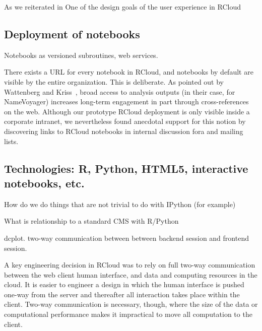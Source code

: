 As we reiterated in 
One of the design goals of the user experience in RCloud 


\subsection{Deployment of notebooks\label{sec:deployment}}

Notebooks as versioned subroutines, web services.

There exists a URL for every notebook in RCloud, and notebooks by
default are visible by the entire organization. This is deliberate.
As pointed out by Wattenberg and Kriss~\cite{Wattenberg:2011:DFS},
broad access to analysis outputs (in their case, for NameVoyager)
increases long-term engagement in part through cross-references on
the web. Although our prototype RCloud deployment is only visible
inside a corporate intranet, we nevertheless found anecdotal support
for this notion by discovering links to RCloud notebooks in internal
discussion fora and mailing lists.

\subsection{Technologies: R, Python, HTML5, interactive notebooks, etc.}



How do we do things that are not trivial to do with IPython (for
example)



What is relationship to a standard CMS with R/Python

dcplot. two-way communication between between backend session and
frontend session.

A key engineering decision in RCloud was to rely on full two-way
communication between the web client human interface, and data and
computing resources in the cloud. It is easier to engineer a design
in which the human interface is pushed one-way from the server
and thereafter all interaction takes place within the client.
Two-way communication is necessary, though, where the size of
the data or computational performance makes it impractical to
move all computation to the client.
